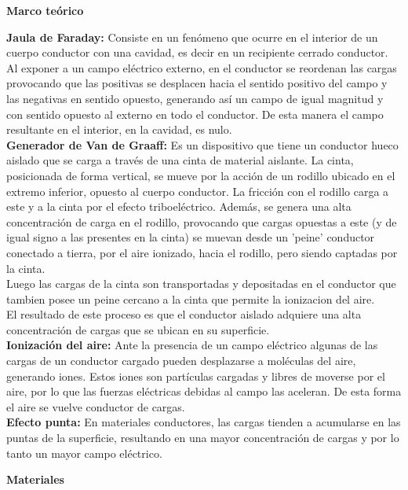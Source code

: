 \documentclass[11pt, letterpaper]{article}
\begin{document}
\begin{center}\textbf{Marco teórico}\end{center}
    \textbf{Jaula de Faraday:} Consiste en un fenómeno que ocurre en el interior
    de un cuerpo conductor con una cavidad, es decir en un recipiente cerrado conductor.
    Al exponer a un campo eléctrico externo, en el conductor se reordenan las cargas
    provocando que las positivas se desplacen hacia el sentido positivo del campo
    y las negativas en sentido opuesto, generando así un campo de igual magnitud
    y con sentido opuesto al externo en todo el conductor. De esta manera el campo
    resultante en el interior, en la cavidad, es nulo.\\
    \textbf{Generador de Van de Graaff:} Es un dispositivo que tiene un conductor
    hueco aislado que se carga a través de una cinta de material aislante.
    La cinta, posicionada de forma vertical, se mueve por la acción de un rodillo
    ubicado en el extremo inferior, opuesto al cuerpo conductor. La fricción con
    el rodillo carga a este y a la cinta por el efecto triboeléctrico.
    Además, se genera una alta concentración de carga en el rodillo, provocando
    que cargas opuestas a este (y de igual signo a las presentes en la cinta)
    se muevan desde un 'peine' conductor conectado a tierra, por el aire ionizado,
    hacia el rodillo, pero siendo captadas por la cinta.\\
    Luego las cargas de la cinta son transportadas y depositadas en el conductor
    que tambien posee un peine cercano a la cinta que permite la ionizacion del
    aire.\\
    El resultado de este proceso es que el conductor aislado adquiere una alta
    concentración de cargas que se ubican en su superficie.\\
    \textbf{Ionización del aire:} Ante la presencia de un campo eléctrico
    algunas de las cargas de un conductor cargado pueden desplazarse 
    a moléculas del aire, generando iones. Estos iones son partículas
    cargadas y libres de moverse por el aire, por lo que las fuerzas 
    eléctricas debidas al campo las aceleran. De esta forma el aire
    se vuelve conductor de cargas.\\
    \textbf{Efecto punta:} En materiales conductores, las cargas tienden
    a acumularse en las puntas de la superficie, resultando en una mayor
    concentración de cargas y por lo tanto un mayor campo eléctrico.\\
\begin{center}\textbf{Materiales}\end{center}
\end{document}

